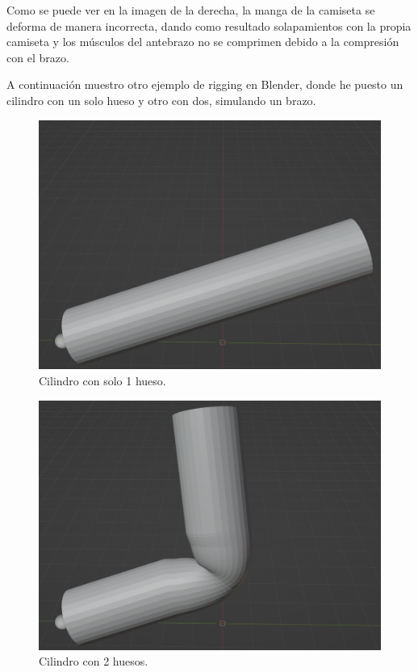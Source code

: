 \documentclass{article}
\begin{document}
Como se puede ver en la imagen de la derecha, la manga de la camiseta se deforma de manera incorrecta, dando como resultado solapamientos con la propia camiseta y los músculos del antebrazo no se comprimen debido a la compresión con el brazo.

\bigskip

A continuación muestro otro ejemplo de rigging en Blender, donde he puesto un cilindro con un solo hueso y otro con dos, simulando un brazo.

\begin{figure}[H]
   \centering
   \includegraphics[width=\textwidth]{imagenes/brazo1.png}
   \caption{Cilindro con solo 1 hueso.}
\end{figure}

\begin{figure}[H]
   \centering
   \includegraphics[width=\textwidth]{imagenes/brazo2.png}
   \caption{Cilindro con 2 huesos.}
\end{figure}
\end{document}
